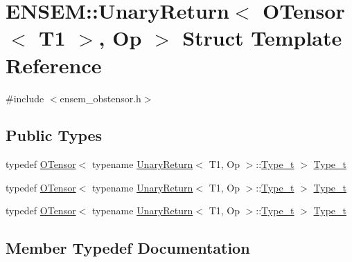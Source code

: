 \hypertarget{structENSEM_1_1UnaryReturn_3_01OTensor_3_01T1_01_4_00_01Op_01_4}{}\section{E\+N\+S\+EM\+:\+:Unary\+Return$<$ O\+Tensor$<$ T1 $>$, Op $>$ Struct Template Reference}
\label{structENSEM_1_1UnaryReturn_3_01OTensor_3_01T1_01_4_00_01Op_01_4}


{\ttfamily \#include $<$ensem\+\_\+obstensor.\+h$>$}

\subsection*{Public Types}
\begin{DoxyCompactItemize}
\item 
typedef \mbox{\hyperlink{classENSEM_1_1OTensor}{O\+Tensor}}$<$ typename \mbox{\hyperlink{structENSEM_1_1UnaryReturn}{Unary\+Return}}$<$ T1, Op $>$\+::\mbox{\hyperlink{structENSEM_1_1UnaryReturn_3_01OTensor_3_01T1_01_4_00_01Op_01_4_a2896ac85d983d41194d2482e3b851bb0}{Type\+\_\+t}} $>$ \mbox{\hyperlink{structENSEM_1_1UnaryReturn_3_01OTensor_3_01T1_01_4_00_01Op_01_4_a2896ac85d983d41194d2482e3b851bb0}{Type\+\_\+t}}
\item 
typedef \mbox{\hyperlink{classENSEM_1_1OTensor}{O\+Tensor}}$<$ typename \mbox{\hyperlink{structENSEM_1_1UnaryReturn}{Unary\+Return}}$<$ T1, Op $>$\+::\mbox{\hyperlink{structENSEM_1_1UnaryReturn_3_01OTensor_3_01T1_01_4_00_01Op_01_4_a2896ac85d983d41194d2482e3b851bb0}{Type\+\_\+t}} $>$ \mbox{\hyperlink{structENSEM_1_1UnaryReturn_3_01OTensor_3_01T1_01_4_00_01Op_01_4_a2896ac85d983d41194d2482e3b851bb0}{Type\+\_\+t}}
\item 
typedef \mbox{\hyperlink{classENSEM_1_1OTensor}{O\+Tensor}}$<$ typename \mbox{\hyperlink{structENSEM_1_1UnaryReturn}{Unary\+Return}}$<$ T1, Op $>$\+::\mbox{\hyperlink{structENSEM_1_1UnaryReturn_3_01OTensor_3_01T1_01_4_00_01Op_01_4_a2896ac85d983d41194d2482e3b851bb0}{Type\+\_\+t}} $>$ \mbox{\hyperlink{structENSEM_1_1UnaryReturn_3_01OTensor_3_01T1_01_4_00_01Op_01_4_a2896ac85d983d41194d2482e3b851bb0}{Type\+\_\+t}}
\end{DoxyCompactItemize}


\subsection{Member Typedef Documentation}
\mbox{\label{structENSEM_1_1UnaryReturn_3_01OTensor_3_01T1_01_4_00_01Op_01_4_a2896ac85d983d41194d2482e3b851bb0}} 
